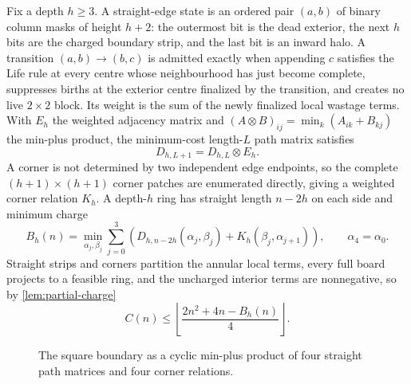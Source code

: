 \documentclass[10pt]{article}
\theoremstyle{remark}
\begin{document}
Fix a depth $h\ge3$.  A straight-edge state is an ordered pair $(a,b)$ of
binary column masks of height $h+2$: the outermost bit is the dead exterior,
the next $h$ bits are the charged boundary strip, and the last bit is an inward
halo.  A transition $(a,b)\to(b,c)$ is admitted exactly when appending $c$
satisfies the Life rule at every centre whose neighbourhood has just become
complete, suppresses births at the exterior centre finalized by the transition,
and creates no live $2\times2$ block.  Its weight is the sum of the newly
finalized local wastage terms.  With $E_h$ the weighted adjacency matrix and
$(A\otimes B)_{ij}=\min_k(A_{ik}+B_{kj})$ the min-plus product, the minimum-cost
length-$L$ path matrix satisfies
\begin{equation}\label{eq:minplus-step}
 D_{h,L+1}=D_{h,L}\otimes E_h.
\end{equation}
A corner is not determined by two independent edge endpoints, so the complete
$(h+1)\times(h+1)$ corner patches are enumerated directly, giving a weighted
corner relation $K_h$.  A depth-$h$ ring has straight length $n-2h$ on each side
and minimum charge
\begin{equation}\label{eq:ring-product}
 B_h(n)=
 \min_{\alpha_j,\beta_j}
 \sum_{j=0}^3
 \left(D_{h,n-2h}(\alpha_j,\beta_j)+K_h(\beta_j,\alpha_{j+1})\right),
 \qquad \alpha_4=\alpha_0.
\end{equation}
Straight strips and corners partition the annular local terms, every full board
projects to a feasible ring, and the uncharged interior terms are nonnegative,
so by \cref{lem:partial-charge}
\begin{equation}\label{eq:Bh-upper}
 C(n)\le
 \left\lfloor\frac{2n^2+4n-B_h(n)}4\right\rfloor.
\end{equation}

\begin{figure}[t]
\centering
{}
\caption{The square boundary as a cyclic min-plus product of four straight path
matrices and four corner relations.}
\label{fig:ring-automaton}
\end{figure}
\end{document}
